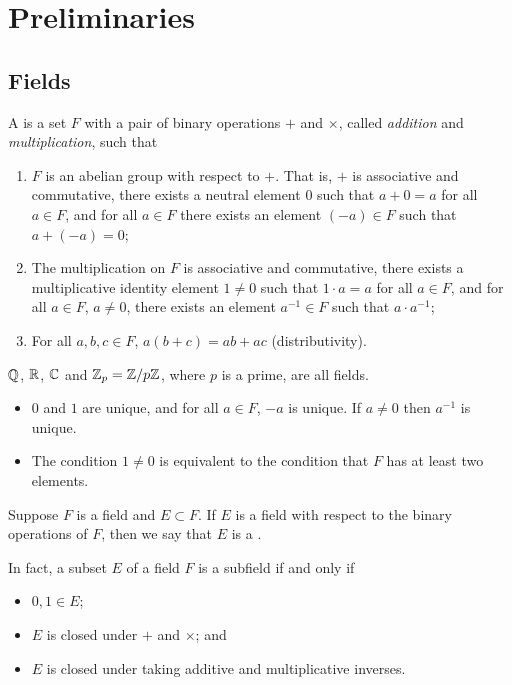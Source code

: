 \section{Preliminaries}
\subsection{Fields}
\begin{definition}
	A  is a set $F$ with a pair of binary operations $+$ and $\times$, called \emph{addition} and \emph{multiplication}, such that
	\begin{enumerate}
		\item $F$ is an abelian group with respect to $+$. That is, $+$ is associative and commutative, there exists a neutral element $0$ such that $a + 0 = a$ for all $a \in F$, and for all $a \in F$ there exists an element $(-a) \in F$ such that $a + (-a) = 0$;
		\item The multiplication on $F$ is associative and commutative, there exists a multiplicative identity element $1 \neq 0$ such that $1 \cdot a = a$ for all $a \in F$, and for all $a \in F$, $a \neq 0$, there exists an element $a^{-1} \in F$ such that $a \cdot a^{-1}$;
		\item For all $a, b, c \in F$, $a(b + c) = ab + ac$ (distributivity).
	\end{enumerate}
\end{definition}

\begin{example}
	$\mathbb{Q}$, $\mathbb{R}$, $\mathbb{C}$ and $\mathbb{Z}_p = \mathbb{Z} / p\mathbb{Z}$, where $p$ is a prime, are all fields.
\end{example}

\begin{remarks} \hfill
	\begin{itemize}
		\item $0$ and $1$ are unique, and for all $a \in F$, $-a$ is unique. If $a \neq 0$ then $a^{-1}$ is unique.
		\item The condition $1 \neq 0$ is equivalent to the condition that $F$ has at least two elements.
	\end{itemize}
\end{remarks}

\begin{definition}
	Suppose $F$ is a field and $E \subset F$. If $E$ is a field with respect to the binary operations of $F$, then we say that $E$ is a .
	
	In fact, a subset $E$ of a field $F$ is a subfield if and only if
	\begin{itemize}
		\item $0, 1 \in E$;
		\item $E$ is closed under $+$ and $\times$; and
		\item $E$ is closed under taking additive and multiplicative inverses.
	\end{itemize}
\end{definition}

